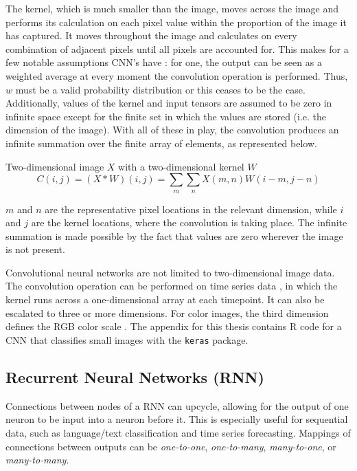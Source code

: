 The kernel, which is much smaller than the image, moves across the image and performs its calculation on each pixel value within the proportion of the image it has captured.  It moves throughout the image and calculates on every combination of adjacent pixels until all pixels are accounted for.  This makes for a few notable assumptions CNN's have \cite{Goodfellow-et-al-2016}: for one, the output can be seen as a weighted average at every moment the convolution operation is performed.  Thus, $w$ must be a valid probability distribution or this ceases to be the case.  Additionally, values of the kernel and input tensors are assumed to be zero in infinite space except for the finite set in which the values are stored (i.e. the dimension of the image).  With all of these in play, the convolution produces an infinite summation over the finite array of elements, as represented below.

Two-dimensional image \(X\) with a two-dimensional kernel \(W\) \[
C(i,j) = (X * W)(i,j) = \sum_m \sum_n X(m,n)W(i-m,j-n)
\]

\(m\) and \(n\) are the representative pixel locations in the relevant
dimension, while \(i\) and \(j\) are the kernel locations, where the
convolution is taking place. The infinite summation is made possible by
the fact that values are zero wherever the image is not present.

Convolutional neural networks are not limited to two-dimensional image data.  The convolution operation can be performed on time series data \cite{Goodfellow-et-al-2016}, in which the kernel runs across a one-dimensional array at each timepoint.  It can also be escalated to three or more dimensions.  For color images, the third dimension defines the RGB color scale \cite{rai}.  The appendix for this thesis contains R code for a CNN that classifies small images with the \texttt{keras} package.



\hypertarget{recurrent-neural-networks-rnn}{%
\subsection{Recurrent Neural Networks
(RNN)}\label{recurrent-neural-networks-rnn}}

Connections between nodes of a RNN can upcycle, allowing for the output of
one neuron to be input into a neuron before it.
\cite{medsker2001recurrent}  This is especially useful for sequential data, such as language/text classification and time series forecasting. Mappings of connections between outputs can be \emph{one-to-one},
\emph{one-to-many}, \emph{many-to-one}, or \emph{many-to-many}.


